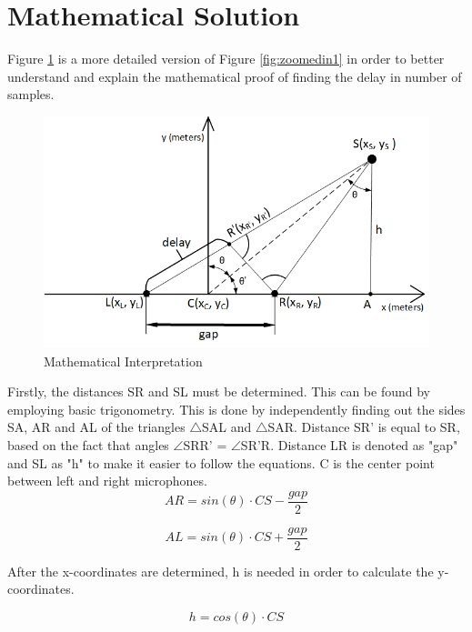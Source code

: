 \newpage
\section{Mathematical Solution}

Figure \ref{fig:zoomedin2} is a more detailed version of Figure \ref{fig:zoomedin1} in order to better
understand and explain the mathematical proof of finding the delay in number of samples.
\begin{figure}[htp]
	\centering
	\includegraphics[width=1\textwidth]{Illustrations/mathematicalShit.jpg}
	\caption{Mathematical Interpretation}
	\label{fig:zoomedin2}
\end{figure}

Firstly, the distances SR and SL must be determined. This can be found by employing 
basic trigonometry. This is done by independently finding out the sides SA, AR and AL of the triangles
$\triangle$SAL  and $\triangle$SAR.
Distance SR' is equal to SR, based on the fact that angles $\angle$SRR' = $\angle$SR'R. Distance LR is denoted as "gap" and SL as "h" to make it easier to follow the equations. C is the center point between left and right microphones.
\begin{equation}
	AR = sin(\theta) \cdot CS  - \dfrac{gap}{2} 
\end{equation}

\begin{equation}
	AL = sin(\theta) \cdot CS + \dfrac{gap}{2}
\end{equation}

After the x-coordinates are determined, h is needed in order to calculate the y-coordinates.

\begin{equation}
	h = cos(\theta) \cdot CS
\end{equation}

